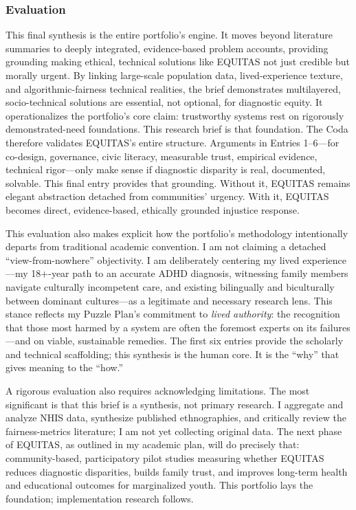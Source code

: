 \documentclass[11pt,twoside]{article}
\begin{document}
\newpage

\subsubsection*{Evaluation}

\vspace{-0.3cm}

This final synthesis is the entire portfolio's engine. It moves beyond literature summaries to deeply integrated, evidence-based problem accounts, providing grounding making ethical, technical solutions like EQUITAS not just credible but morally urgent. By linking large-scale population data, lived-experience texture, and algorithmic-fairness technical realities, the brief demonstrates multilayered, socio-technical solutions are essential, not optional, for diagnostic equity. It operationalizes the portfolio's core claim: trustworthy systems rest on rigorously demonstrated-need foundations. This research brief is that foundation. The Coda therefore validates EQUITAS's entire structure. Arguments in Entries 1--6---for co-design, governance, civic literacy, measurable trust, empirical evidence, technical rigor---only make sense if diagnostic disparity is real, documented, solvable. This final entry provides that grounding. Without it, EQUITAS remains elegant abstraction detached from communities' urgency. With it, EQUITAS becomes direct, evidence-based, ethically grounded injustice response.

This evaluation also makes explicit how the portfolio’s methodology intentionally departs from traditional academic convention. I am not claiming a detached “view-from-nowhere” objectivity. I am deliberately centering my lived experience—my 18+-year path to an accurate ADHD diagnosis, witnessing family members navigate culturally incompetent care, and existing bilingually and biculturally between dominant cultures—as a legitimate and necessary research lens. This stance reflects my Puzzle Plan’s commitment to \textit{lived authority}: the recognition that those most harmed by a system are often the foremost experts on its failures—and on viable, sustainable remedies. The first six entries provide the scholarly and technical scaffolding; this synthesis is the human core. It is the “why” that gives meaning to the “how.”

A rigorous evaluation also requires acknowledging limitations. The most significant is that this brief is a synthesis, not primary research. I aggregate and analyze NHIS data, synthesize published ethnographies, and critically review the fairness-metrics literature; I am not yet collecting original data. The next phase of EQUITAS, as outlined in my academic plan, will do precisely that: community-based, participatory pilot studies measuring whether EQUITAS reduces diagnostic disparities, builds family trust, and improves long-term health and educational outcomes for marginalized youth. This portfolio lays the foundation; implementation research follows.
\end{document}
